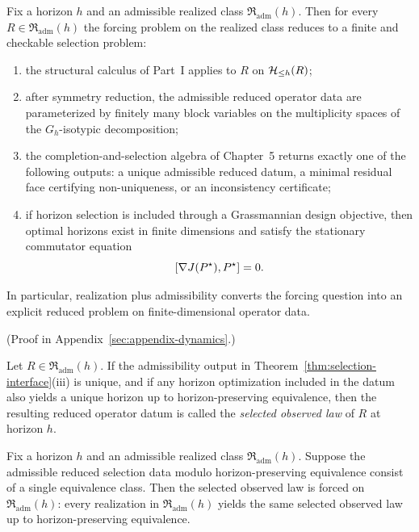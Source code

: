 \begin{theorem}
\label{thm:selection-interface}
Fix a horizon $h$ and an admissible realized class
$\mathfrak R_{\mathrm{adm}}(h)$. Then for every
$R\in\mathfrak R_{\mathrm{adm}}(h)$ the forcing problem on the realized class
reduces to a finite and checkable selection problem:
\begin{enumerate}[label=(\roman*), leftmargin=2em, itemsep=0.2em]
\item the structural calculus of Part~I applies to $R$ on
      $\mathcal{H}_{\le h}(R)$;
\item after symmetry reduction, the admissible reduced operator data are
      parameterized by finitely many block variables on the multiplicity spaces
      of the $G_h$-isotypic decomposition;
\item the completion-and-selection algebra of Chapter~5 returns exactly one of the following outputs:
      a unique admissible reduced datum, a minimal residual face
      certifying non-uniqueness, or an inconsistency certificate;
\item if horizon selection is included through a Grassmannian design objective,
      then optimal horizons exist in finite dimensions and satisfy the
      stationary commutator equation
      \[
      [\nabla J(P^\star),P^\star]=0.
      \]
\end{enumerate}
In particular, realization plus admissibility converts the forcing question
into an explicit reduced problem on finite-dimensional operator data.
\end{theorem}

(Proof in Appendix~\ref{sec:appendix-dynamics}.)

\begin{definition}
\label{def:selected-observed-law}
Let $R\in\mathfrak R_{\mathrm{adm}}(h)$. If the admissibility output in
Theorem~\ref{thm:selection-interface}(iii) is unique, and if any horizon
optimization included in the datum also yields a unique horizon up to
horizon-preserving equivalence, then the resulting reduced operator datum is
called the \emph{selected observed law} of $R$ at horizon $h$.
\end{definition}

\begin{corollary}
\label{cor:selection-to-forcing}
Fix a horizon $h$ and an admissible realized class
$\mathfrak R_{\mathrm{adm}}(h)$. Suppose the admissible reduced selection data
modulo horizon-preserving equivalence consist of a single equivalence class.
Then the selected observed law is forced on
$\mathfrak R_{\mathrm{adm}}(h)$: every realization in
$\mathfrak R_{\mathrm{adm}}(h)$ yields the same selected observed law up to
horizon-preserving equivalence.
\end{corollary}

